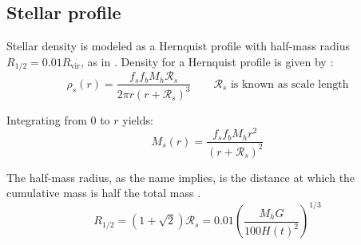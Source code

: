 		\subsection{Stellar profile}
			Stellar density is modeled as a Hernquist profile with half-mass radius $R_{1/2} = 0.01 R_\text{vir}$, as in \citeauthor{choksi2017recoiling}. Density for a Hernquist profile is given by \cite{hernquist1990analytical}:
			\begin{equation}
				\rho_s(r) = \dfrac{f_sf_bM_h \mathcal{R}_s}{2\pi r(r + \mathcal{R}_s)^3} \qquad \text{$\mathcal{R}_s$ is known as scale length}
			\end{equation}
			
			Integrating from $0$ to $r$ yields:
			\begin{equation}
				M_s(r) = \dfrac{f_sf_bM_h r^2}{(r + \mathcal{R}_s)^2}
			\end{equation}
			
			The half-mass radius, as the name implies, is the distance at which the cumulative mass is half the total mass \cite{hernquist1990analytical}.
			\begin{equation}
				R_{1/2} = \left(1 + \sqrt{2}\right)\mathcal{R}_s = 0.01\left({\dfrac{M_hG}{100 H(t)^2}}\right)^{1/3}
			\end{equation}
			
